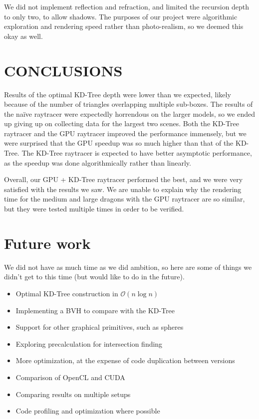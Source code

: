 \documentclass[letterpaper, 10 pt, conference]{ieeeconf}  %
\begin{document}
We did not implement reflection and refraction, and limited the recursion depth to only two, to allow shadows. The purposes of our project were algorithmic exploration and rendering speed rather than photo-realism, so we deemed this okay as well.
\section{CONCLUSIONS}
Results of the optimal KD-Tree depth were lower than we expected, likely because of the number of triangles overlapping multiple sub-boxes. The results of the naïve raytracer were expectedly horrendous on the larger models, so we ended up giving up on collecting data for the largest two scenes. Both the KD-Tree raytracer and the GPU raytracer improved the performance immensely, but we were surprised that the GPU speedup was so much higher than that of the KD-Tree. The KD-Tree raytracer is expected to have better asymptotic performance, as the speedup was done algorithmically rather than linearly.

Overall, our GPU + KD-Tree raytracer performed the best, and we were very satisfied with the results we saw. We are unable to explain why the rendering time for the medium and large dragons with the GPU raytracer are so similar, but they were tested multiple times in order to be verified.

\addtolength{\textheight}{-12cm}   %


\section*{Future work}
We did not have as much time as we did ambition, so here are some of things we didn't get to this time (but would like to do in the future).
\begin{itemize}
\item Optimal KD-Tree construction in $\mathcal{O}(n\log{n})$
\item Implementing a BVH to compare with the KD-Tree
\item Support for other graphical primitives, such as spheres
\item Exploring precalculation for intersection finding
\item More optimization, at the expense of code duplication between versions
\item Comparison of OpenCL and CUDA
\item Comparing results on multiple setups
\item Code profiling and optimization where possible
\end{itemize}
\end{document}
